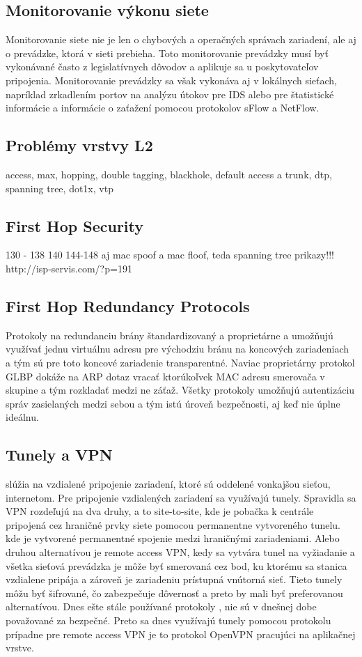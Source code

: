 \subsection*{Monitorovanie výkonu siete}
Monitorovanie siete nie je len o chybových a operačných správach zariadení, ale aj o prevádzke, ktorá v sieti prebieha. Toto monitorovanie prevádzky musí byť vykonávané často z legislatívnych dôvodov a aplikuje sa u poskytovateľov pripojenia. Monitorovanie prevádzky sa však vykonáva aj v lokálnych sieťach, napríklad zrkadlením portov na analýzu útokov pre IDS alebo pre štatistické informácie a informácie o zaťažení pomocou protokolov sFlow a NetFlow.

\subsection*{Problémy vrstvy L2}
access, max, hopping, double tagging, blackhole, default access a trunk, dtp, spanning tree, dot1x, vtp
\subsection*{First Hop Security}
130 - 138 140 144-148 aj mac spoof a mac floof, teda spanning tree prikazy!!!
http://isp-servis.com/?p=191
\subsection*{First Hop Redundancy Protocols}
Protokoly na redundanciu brány štandardizovaný  a proprietárne  a  umožňujú využívať jednu virtuálnu adresu pre východziu bránu na koncových zariadeniach a tým sú pre toto koncové zariadenie transparentné. Naviac proprietárny protokol GLBP dokáže na ARP dotaz vracať ktorúkoľvek MAC adresu smerovača v skupine a tým rozkladať medzi ne záťaž. Všetky protokoly umožňujú autentizáciu správ zasielaných medzi sebou a tým istú úroveň bezpečnosti, aj keď nie úplne ideálnu.  

\subsection*{Tunely a VPN}
 slúžia na vzdialené pripojenie zariadení, ktoré sú oddelené vonkajšou sieťou, internetom. Pre pripojenie vzdialených zariadení sa využívajú tunely. Spravidla sa VPN rozdeľujú na dva druhy, a to site-to-site, kde je pobačka k centrále pripojená cez hraničné prvky siete pomocou permanentne vytvoreného tunelu.  kde je vytvorené permanentné spojenie medzi hraničnými zariadeniami. Alebo druhou alternatívou je remote access VPN, kedy sa vytvára tunel na vyžiadanie a všetka sieťová prevádzka je môže byť smerovaná cez bod, ku ktorému sa stanica vzdialene pripája a zároveň je zariadeniu prístupná vnútorná sieť. Tieto tunely môžu byť šifrované, čo zabezpečuje dôvernosť a preto by mali byť preferovanou alternatívou. Dnes ešte stále používané protokoly ,  nie sú v dnešnej dobe považované za bezpečné. Preto sa dnes využívajú tunely pomocou protokolu  prípadne pre remote access VPN je to protokol OpenVPN pracujúci na aplikačnej vrstve.

